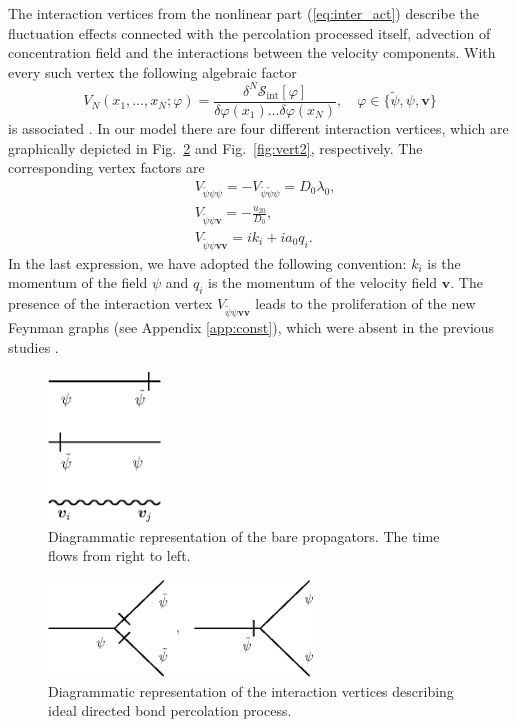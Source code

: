\documentclass[aps,pre,url,twocolumn,superscriptaddress]{revtex4-1}
\def\mv{{\bm v}}
\def\S{\mathcal{S}}
\begin{document}
The interaction vertices from the nonlinear part
(\ref{eq:inter_act}) describe
 the fluctuation effects connected with the 
 percolation processed itself,
 advection of concentration field and the interactions between
 the velocity components.
With every such vertex
the following algebraic factor 
\begin{equation*}
  V_N(x_1,\ldots,x_N;\varphi) = 
  \frac{\delta^N \S_{\text{int}}[\varphi]}{\delta\varphi(x_1)\ldots\delta\varphi(x_N)},
  \quad
  \varphi \in\{\tilde{\psi},\psi,\mv \}
  \label{eq:ver_factor}
\end{equation*}
is associated \cite{Vasiliev} . 
In our model there are four different interaction vertices, which are
graphically depicted in Fig.~\ref{fig:vert1} and Fig.~\ref{fig:vert2}, respectively.
The corresponding vertex factors are
\begin{align}
   & V_{\tilde{\psi}{\psi} \psi} =
       - V_{\tilde{\psi}\tilde{\psi} \psi} = D_0\lambda_0,\\
   & V_{\tilde{\psi}\psi\mv} = - \frac{u_{20}}{D_0},\\
   & V_{\tilde{\psi}\psi\mv\mv} = ik_i +i a_0 q_i.
   \label{eq:factors}
\end{align}
In the last expression, we have adopted the following convention:
$k_i$ is the momentum of the field $\psi$ and $q_i$
is the momentum of the velocity field $\mv$.
The presence of the interaction vertex $V_{\tilde{\psi}\psi\mv\mv}$ leads
to the proliferation of the new Feynman graphs (see Appendix \ref{app:const}), which
were absent in the previous studies \cite{AntKap08,AntKap10,DP13}. 
% 
\begin{figure}
   \includegraphics[width=3cm]{prop.eps}
   \caption{Diagrammatic representation of the bare
   propagators. The time flows from right to left.}
   \label{fig:prop}
\end{figure}

\begin{figure}
   \includegraphics[width=7cm]{vertices1.eps}
   \caption{Diagrammatic representation of the interaction vertices 
   describing ideal directed bond percolation process.}
   \label{fig:vert1}
\end{figure}
\end{document}
